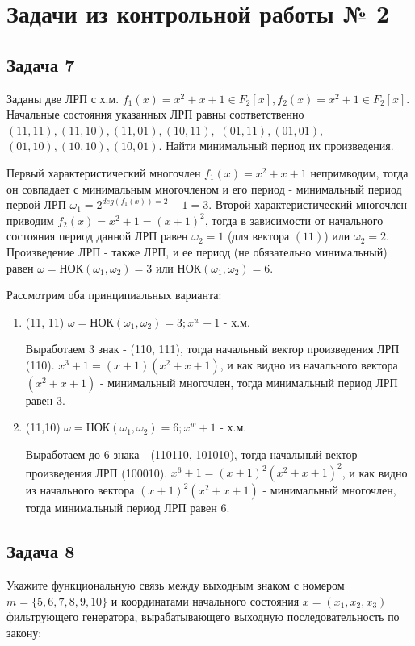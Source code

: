 \documentclass[utf8x, 14pt]{G7-32} %
\begin{document}
\section{Задачи из контрольной работы № 2}
\subsection{Задача 7}
Заданы две ЛРП с х.м. $f_1(x)=x^2+x+1 \in F_2[x], f_2(x)=x^2+1\in F_2[x]$. Начальные состояния указанных ЛРП равны соответственно $ (11, 11), (11, 10), (11, 01), (10, 11),$ $ (01, 11), (01, 01), $ $(01, 10), (10, 10), (10, 01) $. Найти минимальный период их произведения.

Первый характеристический многочлен $f_1(x)=x^2+x+1$ непримводим, тогда он совпадает с минимальным многочленом и его период - минимальный период первой ЛРП $\omega_1 = 2^{deg(f_1(x))=2} -1 = 3$. Второй характеристический многочлен приводим $f_2(x)=x^2+1 = (x+1)^2$, тогда в зависимости от начального состояния период данной ЛРП равен $\omega_2 = 1$ (для вектора $(11)$) или $\omega_2 = 2$. Произведение ЛРП - также ЛРП, и ее период (не обязательно минимальный) равен $\omega = $НОК$(\omega_1,\omega_2) = 3$ или НОК$(\omega_1,\omega_2) = 6$.

Рассмотрим оба принципиальных варианта:
\begin{enumerate}
    \item (11, 11)
    $\omega = $НОК$(\omega_1,\omega_2) = 3; x^w+1$ - х.м.
    
    Выработаем 3 знак - (110, 111), тогда начальный вектор произведения ЛРП (110). $x^3+1 = (x+1)(x^2+x+1)$, и как видно из начального вектора $(x^2+x+1)$ - минимальный многочлен, тогда минимальный период ЛРП равен $3$.
    \item (11,10)
    $\omega = $НОК$(\omega_1,\omega_2) = 6; x^w+1$ - х.м.
    
    Выработаем до 6 знака - (110110, 101010), тогда начальный вектор произведения ЛРП (100010). $x^6+1 = (x+1)^2(x^2+x+1)^2$, и как видно из начального вектора $(x+1)^2(x^2+x+1)$ - минимальный многочлен, тогда минимальный период ЛРП равен $6$.
\end{enumerate}

\subsection{Задача 8}
Укажите функциональную связь между выходным знаком с номером $m = \{5,6,7,8,9,10\}$ и координатами начального состояния $x=(x_1,x_2,x_3)$ фильтрующего генератора, вырабатывающего выходную последовательность по закону: 
\end{document}

